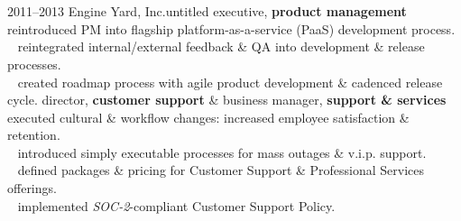 \documentclass[]{friggeri-cv} %
\begin{document}
\section{{}{} {\normalsize{}~~}}

\begin{entrylist}
\entry
{2011--2013}
{Engine Yard, Inc.}{untitled executive, \textbf{\color{DarkGray}product management}}
{{\tiny {}} ~ reintroduced PM into flagship platform-as-a-service (PaaS) development process.\\
{\tiny {}} ~ reintegrated internal/external feedback \& QA into development \& release processes.\\
{\tiny {}} ~ created roadmap process with agile product development \& cadenced release cycle.}
\entry
{}{}{director, \textbf{\color{DarkGray}customer support} \& business manager, \textbf{\color{DarkGray}support \& services}}
{{\tiny {}} ~ executed cultural \& workflow changes: increased employee satisfaction \& retention.\\
{\tiny {}} ~ introduced simply executable processes for mass outages \& v.i.p. support.\\
{\tiny {}} ~ defined packages \& pricing for Customer Support \& Professional Services offerings.\\
{\tiny {}} ~ implemented \emph{SOC-2}-compliant Customer Support Policy.\\

}
\end{entrylist}
\end{document}
